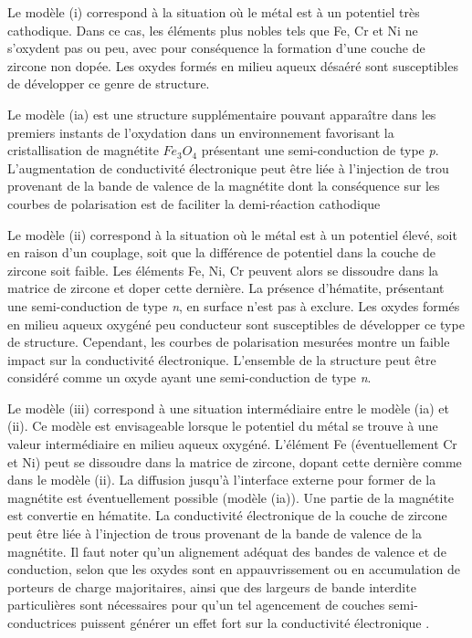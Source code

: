 \begin{refsection}
    Le modèle (i) correspond à la situation où le métal est à un potentiel très cathodique. Dans ce cas, les
    éléments plus nobles tels que Fe, Cr et Ni ne s'oxydent pas ou peu, avec pour conséquence la formation d'une couche
    de zircone non dopée. Les oxydes formés en milieu aqueux désaéré sont susceptibles de développer ce genre de
    structure.

    Le modèle (ia) est une structure
    supplémentaire pouvant apparaître dans les premiers instants de l'oxydation dans un environnement favorisant la
    cristallisation de magnétite $Fe_3O_4$ présentant une semi-conduction de type \emph{p}. L'augmentation de conductivité
    électronique peut être liée à l'injection de trou provenant de la bande de valence de la magnétite dont la
    conséquence sur les courbes de polarisation est de faciliter la demi-réaction cathodique

    Le modèle (ii) correspond à la situation où le métal est à un potentiel élevé, soit en raison d'un couplage, soit
    que la différence de potentiel dans la couche de zircone soit faible.
    Les
    éléments Fe, Ni, Cr peuvent alors se dissoudre dans la matrice de zircone et doper cette dernière. La présence d'hématite,
    présentant une semi-conduction de type \emph{n}, en
    surface n'est pas à exclure. Les oxydes formés en milieu aqueux oxygéné peu conducteur sont susceptibles de
    développer ce type de structure. Cependant, les courbes de polarisation mesurées montre un faible impact sur la
    conductivité électronique. L'ensemble de la structure peut être considéré comme un oxyde ayant une semi-conduction
    de type \emph{n}.


    Le modèle (iii) correspond à une situation intermédiaire entre le modèle (ia) et (ii). Ce modèle est envisageable
    lorsque le potentiel du métal se trouve à une valeur intermédiaire en milieu aqueux
    oxygéné. L'élément Fe (éventuellement Cr et Ni) peut se dissoudre dans la matrice de zircone, dopant cette
    dernière comme dans le modèle (ii). La diffusion jusqu'à l'interface externe pour former de la magnétite
    est éventuellement possible (modèle (ia)). Une partie de la magnétite est convertie en hématite. La conductivité
    électronique de la couche de zircone peut être liée à l'injection de trous provenant de la bande de valence de la
    magnétite. Il faut noter qu'un alignement adéquat des bandes de valence et de conduction, selon que les oxydes sont
    en appauvrissement
    ou en accumulation de porteurs de charge majoritaires, ainsi que des largeurs de bande interdite particulières 
    sont nécessaires pour qu'un tel agencement de couches
    semi-conductrices puissent générer un effet fort sur la conductivité électronique \citep{Gerischer1985}.


\end{refsection}
